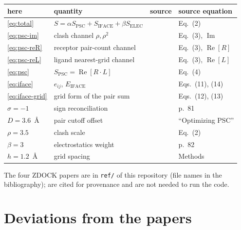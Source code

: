 \documentclass[11pt,a4paper]{article}
\newcommand{\Spsc}{S_{\mathrm{PSC}}}
\newcommand{\Siface}{S_{\mathrm{IFACE}}}
\newcommand{\Selec}{S_{\mathrm{ELEC}}}
\begin{document}
\begin{center}
\begin{tabular}{llll}
  \toprule
  here & quantity & source & source equation \\
  \midrule
  \eqref{eq:total}   & $S = \alpha \Spsc + \Siface + \beta \Selec$
                     & \cite{Chen2003zdock} & Eq.~(2) \\
  \eqref{eq:psc-im}  & clash channel $\rho,\rho^2$
                     & \cite{ChenWeng2003psc} & Eq.~(3), $\operatorname{Im}$ \\
  \eqref{eq:psc-reR} & receptor pair-count channel
                     & \cite{ChenWeng2003psc} & Eq.~(3), $\operatorname{Re}[R]$ \\
  \eqref{eq:psc-reL} & ligand nearest-grid channel
                     & \cite{ChenWeng2003psc} & Eq.~(3), $\operatorname{Re}[L]$ \\
  \eqref{eq:psc}     & $\Spsc = \operatorname{Re}[R\cdot L]$
                     & \cite{ChenWeng2003psc} & Eq.~(4) \\
  \eqref{eq:iface}   & $e_{ij}$, $E_{\mathrm{IFACE}}$
                     & \cite{Mintseris2007} & Eqs.~(11), (14) \\
  \eqref{eq:iface-grid} & grid form of the pair sum
                     & \cite{Mintseris2007} & Eqs.~(12), (13) \\
  $\sigma = -1$      & sign reconciliation & \cite{Chen2003zdock} & p.~81 \\
  $D = 3.6$~\AA      & pair cutoff offset & \cite{ChenWeng2003psc} & ``Optimizing PSC'' \\
  $\rho = 3.5$       & clash scale & \cite{Chen2003zdock} & Eq.~(2) \\
  $\beta = 3$        & electrostatics weight & \cite{Chen2003zdock} & p.~82 \\
  $h = 1.2$~\AA      & grid spacing & \cite{ChenWeng2003psc} & Methods \\
  \bottomrule
\end{tabular}
\end{center}

The four ZDOCK papers are in \texttt{ref/} of this repository (file names in
the bibliography); \cite{Zhang1997ace,Katchalski1992,Basu2016dockq} are cited
for provenance and are not needed to run the code.

\section{Deviations from the papers}
\end{document}
